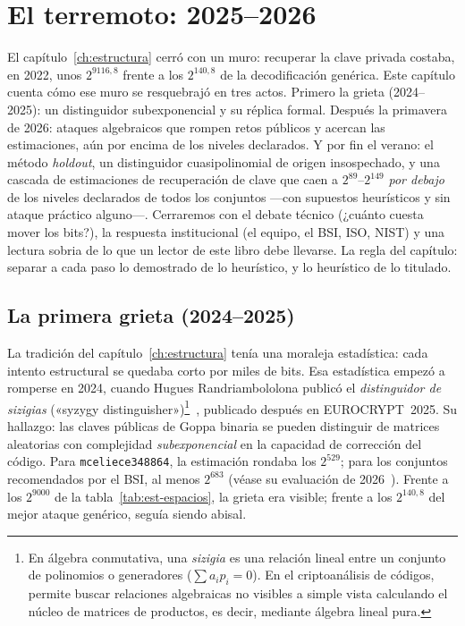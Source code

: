 \documentclass[11pt,a4paper,oneside]{report}
\begin{document}
\chapter{El terremoto: 2025--2026}\label{ch:2026}

\begin{roadmap}
El capítulo~\ref{ch:estructura} cerró con un muro: recuperar la clave
privada costaba, en 2022, unos $2^{9116{,}8}$ frente a los
$2^{140{,}8}$ de la decodificación genérica. Este capítulo cuenta cómo
ese muro se resquebrajó en tres actos. Primero la grieta
(2024--2025): un distinguidor subexponencial y su réplica formal.
Después la primavera de 2026: ataques algebraicos que rompen retos
públicos y acercan las estimaciones, aún por encima de los niveles
declarados. Y por fin el verano: el método \emph{holdout}, un
distinguidor cuasipolinomial de origen insospechado, y una cascada de
estimaciones de recuperación de clave que caen a $2^{89}$--$2^{149}$
\emph{por debajo} de los niveles declarados de todos los conjuntos
---con supuestos heurísticos y sin ataque práctico alguno---. Cerraremos
con el debate técnico (¿cuánto cuesta mover los bits?), la respuesta
institucional (el equipo, el BSI, ISO, NIST) y una lectura sobria de
lo que un lector de este libro debe llevarse. La regla del capítulo:
separar a cada paso lo demostrado de lo heurístico, y lo heurístico de
lo titulado.
\end{roadmap}

\section{La primera grieta (2024--2025)}\label{sec:2026-grieta}

La tradición del capítulo~\ref{ch:estructura} tenía una moraleja
estadística: cada intento estructural se quedaba corto por miles de
bits. Esa estadística empezó a romperse en 2024, cuando Hugues
Randriambololona publicó el \emph{distinguidor de sizigias}
(«syzygy distinguisher»)\footnote{En álgebra conmutativa, una \emph{sizigia}
es una relación lineal entre un conjunto de polinomios o generadores
($\sum a_i p_i = 0$). En el criptoanálisis de códigos, permite buscar
relaciones algebraicas no visibles a simple vista calculando el núcleo de
matrices de productos, es decir, mediante álgebra lineal pura.}~\cite{randriam2024},
publicado después en EUROCRYPT~2025. Su hallazgo: las claves públicas de Goppa binaria se
pueden distinguir de matrices aleatorias con complejidad
\emph{subexponencial} en la capacidad de corrección del código. Para
\texttt{mceliece348864}, la estimación rondaba los $2^{529}$; para
los conjuntos recomendados por el BSI, al menos $2^{683}$ (véase su
evaluación de 2026~\cite{bsi2026}). Frente a los $2^{9000}$ de la
tabla~\ref{tab:est-espacios}, la grieta era visible; frente a los
$2^{140{,}8}$ del mejor ataque genérico, seguía siendo abisal.
\end{document}
